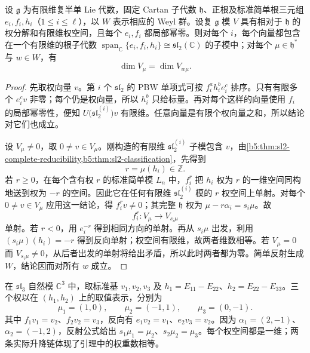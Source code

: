 \begin{lemma}\label{b5:lem:integrable-weight-symmetry}
	设 \(\mathfrak g\) 为有限维复半单 Lie 代数，固定 Cartan 子代数 \(\mathfrak h\)、正根及标准简单根三元组 \(e_i,f_i,h_i\)（\(1\le i\le\ell\)），以 \(W\) 表示相应的 Weyl 群。设复 \(\mathfrak g\) 模 \(V\) 具有相对于 \(\mathfrak h\) 的权分解和有限维权空间，且每个 \(e_i,f_i\) 都局部幂零。则对每个 \(i\)，每个向量都包含在一个有限维的根子代数 \(\operatorname{span}_{\mathbb C}\{e_i,f_i,h_i\}\cong\mathfrak{sl}_2(\mathbb C)\) 的子模中；对每个 \(\mu\in\mathfrak h^*\) 与 \(w\in W\)，有
	\[
		\dim V_\mu=\dim V_{w\mu}.
	\]
\end{lemma}
\begin{proof}
	先取权向量 \(v\)。第 \(i\) 个 \(\mathfrak{sl}_2\) 的 PBW 单项式可按 \(f_i^a h_i^b e_i^c\) 排序。只有有限多个 \(e_i^cv\) 非零；每个仍是权向量，所以 \(h_i^b\) 只给标量。再对每个这样的向量使用 \(f_i\) 的局部幂零性，便知 \(U\bigl(\mathfrak{sl}_2^{(i)}\bigr)v\) 有限维。任意向量是有限个权向量之和，所以结论对它们也成立。

	设 \(V_\mu\ne0\)，取 \(0\ne v\in V_\mu\)。刚构造的有限维 \(\mathfrak{sl}_2^{(i)}\) 子模包含 \(v\)，由\cref{b5:thm:sl2-complete-reducibility,b5:thm:sl2-classification}，先得到
	\[
		r=\mu(h_i)\in\mathbb Z.
	\]
	若 \(r\ge0\)，在每个含有权 \(r\) 的标准简单模 \(L_n\) 中，\(f_i^r\) 把 \(h_i\) 权为 \(r\) 的一维空间同构地送到权为 \(-r\) 的空间。因此它在任何有限维 \(\mathfrak{sl}_2^{(i)}\) 模的 \(r\) 权空间上单射。对每个 \(0\ne v\in V_\mu\) 应用这一结论，得 \(f_i^rv\ne0\)；其完整 \(\mathfrak h\) 权为 \(\mu-r\alpha_i=s_i\mu\)。故
	\[
		f_i^r:V_\mu\longrightarrow V_{s_i\mu}
	\]
	单射。若 \(r<0\)，用 \(e_i^{-r}\) 得到相同方向的单射。再从 \(s_i\mu\) 出发，利用 \((s_i\mu)(h_i)=-r\) 得到反向单射；权空间有限维，故两者维数相等。若 \(V_\mu=0\) 而 \(V_{s_i\mu}\ne0\)，从后者出发的单射将给出矛盾，所以此时两者都为零。简单反射生成 \(W\)，结论因而对所有 \(w\) 成立。
\end{proof}

在 \(\mathfrak{sl}_3\) 自然模 \(\mathbb C^3\) 中，取标准基 \(v_1,v_2,v_3\) 及 \(h_1=E_{11}-E_{22}\)、\(h_2=E_{22}-E_{33}\)。三个权以在 \((h_1,h_2)\) 上的取值表示，分别为
\[
	\mu_1=(1,0),\qquad \mu_2=(-1,1),\qquad \mu_3=(0,-1).
\]
其中 \(f_1v_1=v_2\)、\(f_2v_2=v_3\)，反向有 \(e_1v_2=v_1\)、\(e_2v_3=v_2\)。因为 \(\alpha_1=(2,-1)\)、\(\alpha_2=(-1,2)\)，反射公式给出 \(s_1\mu_1=\mu_2\)、\(s_2\mu_2=\mu_3\)。每个权空间都是一维；两条实际升降链体现了引理中的权重数相等。

